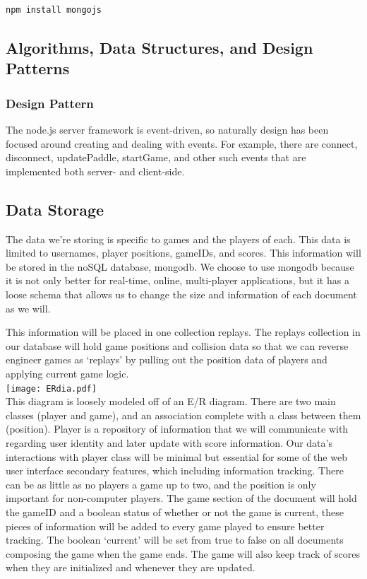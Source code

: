 \documentclass[letterpaper,12pt]{article}
\begin{document}
\begin{verbatim}
npm install mongojs
\end{verbatim}

\subsection{Algorithms, Data Structures, and Design Patterns}
\subsubsection{Design Pattern}
The node.js server framework is event-driven, so naturally design has been focused around creating and dealing with events.
For example, there are connect, disconnect, updatePaddle, startGame, and other such events that are implemented both server- and client-side.

\subsection{Data Storage}
The data we’re storing is specific to games and the players of each. This data is limited to usernames, player positions, gameIDs, and scores. This information will be stored in the noSQL database, mongodb. We choose to use mongodb because it is not only better for real-time, online, multi-player applications, but it has a loose schema that allows us to change the size and information of each document as we will.

This information will be placed in one collection replays. The replays collection in our database will hold game positions and collision data so that we can reverse engineer games as ‘replays’ by pulling out the position data of players and applying current game logic. \\

\texttt{[image: ERdia.pdf]} \\


This diagram is loosely modeled off of an E/R diagram. There are two main classes (player and game), and an association complete with a class between them (position). Player is a repository of information that we will communicate with regarding user identity and later update with score information. Our data’s interactions with player class will be minimal but essential for some of the web user interface secondary features, which including information tracking. There can be as little as no players a game up to two, and the position is only important for non-computer players. The game section of the document will hold the gameID and a boolean status of whether or not the game is current, these pieces of information will be added to every game played to ensure better tracking. The boolean ‘current’ will be set from true to false on all documents composing the game when the game ends. The game will also keep track of scores when they are initialized and whenever they are updated.
\end{document}
